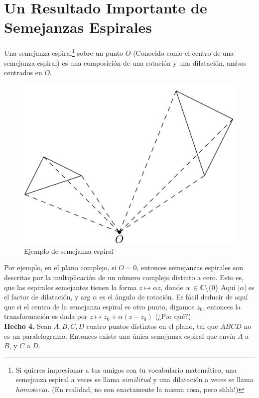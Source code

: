 \documentclass[11pt, a4paper]{article}
\begin{document}
	\setcounter{section}{3}
	\newcommand\Tau{\mathrm{T}}
\section{Un Resultado Importante de Semejanzas Espirales}
\setcounter{footnote}{1}
Una semejanza espiral\footnote{Si quieres impresionar a tus amigos con tu vocabulario matem\'atico, una semejanza espiral a veces se llama $similitud$ y una dilataci\'on a veces se llama $homotecia$. (En realidad, no son exactamente la misma cosa, pero shhh!)} sobre un punto $O$ (Conocido como el centro de una semejanza espiral) es una composici\'on de una rotaci\'on y una dilataci\'on, ambos centrados en $O$.
\setcounter{figure}{3}
\begin{figure}[h]
	\centering
	\includegraphics[scale=0.3]{p4.1}
	\caption{Ejemplo de semejanza espiral}
\end{figure}


Por ejemplo, en el plano complejo, si $O=0$, entonces semejanzas espirales son descritas por la multiplicaci\'on de un n\'umero complejo distinto a cero. Esto es, que las espirales semejantes tienen la forma $z \mapsto \alpha z$, donde $\alpha \ \in \mathbb{C} \setminus \{0\}$ Aqu\'i $|\alpha|$ es el factor de dilataci\'on, y arg $\alpha$ es el \'angulo de rotaci\'on. Es f\'acil deducir de aqu\'i que si el centro de la semejanza espiral es otro punto, digamos $z_0$, entonces la transformaci\'on es dada por $z \mapsto z_0 + \alpha (z - z_0)$ (¿Por qué?)
\\
\textbf{Hecho 4.} Sean $A, B, C, D$ cuatro puntos distintos en el plano, tal que $ABCD$ no es un paralelogramo. Entonces existe una \'unica semejanza espiral que env\'ia $A$ a $B$, y $C$ a $D$.\\
\end{document}
